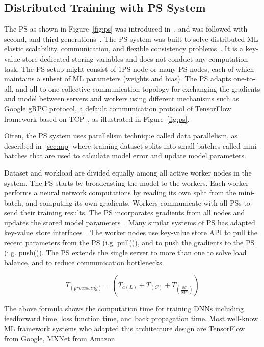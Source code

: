 \documentclass[conference]{IEEEtran}
\begin{document}
\subsection{Distributed Training with PS System}
\label{sec:permodelcs}

The PS as shown in Figure~\ref{fig:ps} was introduced in~\cite{smola2010architecture}, and was followed with second, and third generations~\cite{dean2012large, li2014scaling}. The PS system was built to solve distributed ML elastic scalability, communication, and flexible consistency problems~\cite{li2014communication}. It is a key-value store dedicated storing variables and does not conduct any computation task. The PS setup might consist of 1PS node or many PS nodes, each of which maintains a subset of ML parameters (weights and bias). The PS adapts one-to-all, and all-to-one collective communication topology for exchanging the gradients and model between servers and workers using different mechanisms such as Google gRPC protocol, a default communication protocol of TensorFlow framework based on TCP~\cite{website2013}, as illustrated in Figure~\ref{fig:ps}. 

Often, the PS system uses parallelism technique called data parallelism, as described in~\ref{sec:mp} where training dataset splits into small batches called mini-batches that are used to calculate model error and update model parameters. 

Dataset and workload are divided equally among all active worker nodes in the system. The PS starts by broadcasting the model to the workers. Each worker performs a neural network computations by reading its own split from the mini-batch, and computing its own gradients. Workers communicate with all PSs to send their training results. The PS incorporates gradients from all nodes and updates the stored model parameters~\cite{iandola2016firecaffe}. Many similar systems of PS has adapted key-value store interfaces~\cite{dai2013petuum}. The worker nodes use key-value store API to pull the recent parameters from the PS (i.g. pull()), and to push the gradients to the PS (i.g. push()). The PS extends the single server to more than one to solve load balance, and to reduce communication bottlenecks.  

\begin{equation}
T_{(processing)} = (T_{a{(L)}} + T_{(C)} + T_{(\frac{\partial{C}}{\partial{W^{L}}})})
\end{equation}

The above formula shows the computation time for training DNNs including feedforward time, loss function time, and back propagation time. Most well-know ML framework systems who adapted this architecture design are TensorFlow from Google, MXNet from Amazon. 
\end{document}
